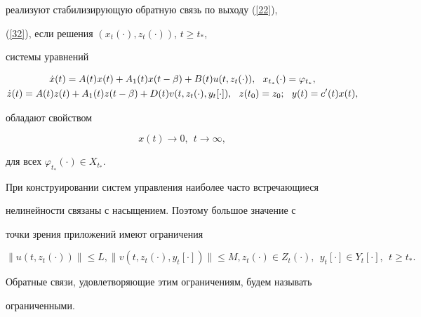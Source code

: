 реализуют стабилизирующую обратную связь по выходу (\ref{22}),


(\ref{32}), если решения $(x_t(\cdot),z_t(\cdot))$, $t \ge t_*$,


системы уравнений


\begin{gather}


\Dot x(t)=A(t)x(t)+A_1(t)x(t-\beta)+B(t)u(t,z_t(\cdot)),


\ \ x_{t_*}(\cdot) = \varphi_{t_*},\notag \\


%


\label{37}


\Dot z (t) =


A(t)z(t)+A_1(t)z(t-\beta)+D(t)v(t,z_t(\cdot),y_t[\cdot]),


\ \ z(t_0)=z_0;\ \ y(t)=c'(t)x(t),


\end{gather}


обладают свойством


\begin{equation}\label{38}


x(t) \rightarrow 0,\ \ t \rightarrow \infty,


\end{equation}


для всех $\varphi_{t_*}(\cdot) \in X_{t_*}$.





При конструировании систем управления наиболее часто встречающиеся


нелинейности связаны с насыщением. Поэтому большое значение с


точки зрения приложений имеют ограничения


$$




\|u(t,z_t(\cdot))\| \le L, \| v(t,z_t(\cdot), y_t[\cdot])\| \le


M, z_t(\cdot) \in Z_t(\cdot),\ \ y_t[\cdot] \in Y_t[\cdot],\ \ t \ge


t_*.




$$


Обратные связи, удовлетворяющие этим ограничениям, будем называть


ограниченными.





